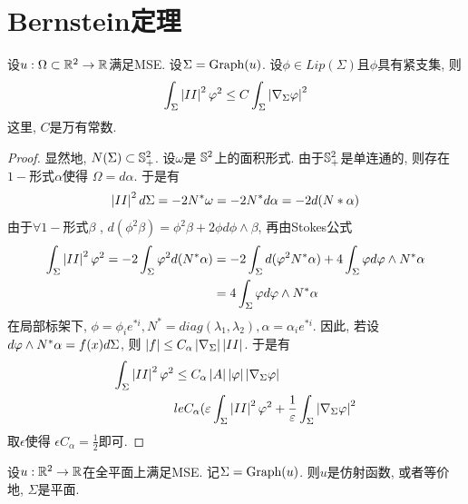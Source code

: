 \section{Bernstein定理}
\begin{proposition} \label{caccio}
    设$u: \Omega \subset \R^2 \to \R$满足MSE. 设$\Sigma=\G(u)$. 设$\phi \in Lip(\Sigma)$且$\phi$具有紧支集, 则
    \begin{equation}
        \int_{\Sigma}\abs{II}^2\phi^2 \le C\int_\Sigma \abs{\nabla_{\Sigma}\phi}^2
    \end{equation}
    这里,  $C$是万有常数.
\end{proposition}
\begin{proof}
    显然地, $\N(\Sigma) \subset \S^2_+$. 设$\omega$是 $\S^2$上的面积形式. 由于$\S^2_+$是单连通的, 则存在$1-$形式$\alpha$使得  $\Omega=d\alpha$. 于是有 
    \begin{equation}
        \abs{II}^2d\Sigma=-2\N^*\omega=-2\N^*d\alpha=-2d(\N*\alpha)
    \end{equation}
    由于$\forall 1-$形式$\beta$ , $d(\phi^2\beta)=\phi^2\beta+2\phi d\phi\wedge\beta$, 再由Stokes公式
    \begin{equation}
        \begin{split}
            \int_\Sigma \abs{II}^2\phi^2 = -2 \int_\Sigma \phi^2 d(\N^*\alpha) &=-2\int_\Sigma d(\phi^2\N^*\alpha)+4\int_\Sigma \phi d\phi\wedge N^*\alpha\\
            &= 4\int_\Sigma  \phi d\phi\wedge N^*\alpha
        \end{split}
    \end{equation}
    在局部标架下, $\phi=\phi_i e^{*i}, N^*=diag(\lambda_1,\lambda_2), \alpha=\alpha_i e^{*i}$. 因此, 若设 $d\phi\wedge \N^*\alpha= f(x)d\Sigma$, 则 $\abs{f} \le C_\alpha \abs{\nabla_\Sigma}\abs{II}$. 于是有
    \begin{equation}
        \begin{split}
            \int_\Sigma \abs{II}^2\phi^2 &\le C_\alpha \abs{A}\abs{\phi} \abs{\nabla_\Sigma \phi} \\
            & le C_\alpha(\epsilon \int_\Sigma \abs{II}^2\phi^2 + \frac{1}{\epsilon}\int_\Sigma  \abs{\nabla_\Sigma \phi}^2 \\
        \end{split}
    \end{equation}
    取$\epsilon$使得 $\epsilon C_\alpha=\frac{1}{2}$即可.
\end{proof}
\begin{theorem}
    设$u: \R^2 \to \R$在全平面上满足MSE.  记$\Sigma=\G(u)$. 则$u$是仿射函数, 或者等价地, $\Sigma$是平面.
\end{theorem}
